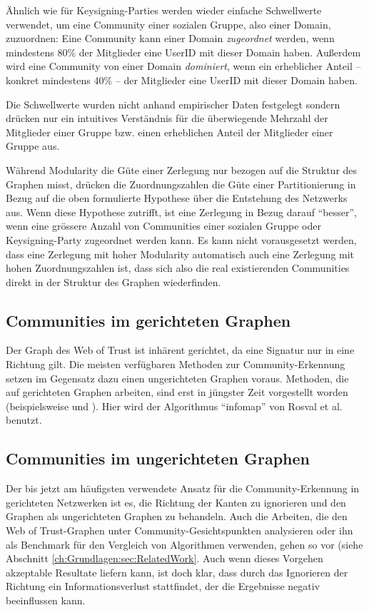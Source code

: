 Ähnlich wie für Keysigning-Parties werden wieder einfache
Schwellwerte verwendet, um eine Community einer sozialen Gruppe, also
einer Domain, zuzuordnen: Eine Community kann einer Domain
\emph{zugeordnet} werden, wenn mindestens 80\% der Mitglieder
eine UserID mit dieser Domain haben. Außerdem wird eine Community von
einer Domain \emph{dominiert}, wenn ein erheblicher Anteil -- konkret
mindestens 40\% -- der Mitglieder eine UserID mit dieser Domain haben.

Die Schwellwerte wurden nicht anhand empirischer Daten festgelegt
sondern drücken nur ein intuitives Verständnis für die
überwiegende Mehrzahl der Mitglieder einer Gruppe bzw. einen
erheblichen Anteil der Mitglieder einer Gruppe aus.

Während Modularity die Güte einer Zerlegung nur bezogen auf die
Struktur des Graphen misst, drücken die Zuordnungszahlen die Güte
einer Partitionierung in Bezug auf die oben formulierte Hypothese
über die Entstehung des Netzwerks aus. Wenn diese Hypothese
zutrifft, ist eine Zerlegung in Bezug darauf ``besser'', wenn eine
grössere Anzahl von Communities einer sozialen Gruppe oder
Keysigning-Party zugeordnet werden kann. Es kann nicht vorausgesetzt
werden, dass eine Zerlegung mit hoher Modularity automatisch auch eine
Zerlegung mit hohen Zuordnungszahlen ist, dass sich also die real
existierenden Communities direkt in der Struktur des Graphen
wiederfinden.

\subsection{Communities im gerichteten Graphen}
\label{sec:comm-gericht-graph}
Der Graph des Web of Trust ist inhärent gerichtet, da eine Signatur
nur in eine Richtung gilt. Die meisten verfügbaren Methoden zur
Community-Erkennung setzen im Gegensatz dazu einen ungerichteten
Graphen voraus. Methoden, die auf gerichteten Graphen arbeiten, sind
erst in jüngster Zeit vorgestellt worden (beispielsweise
\cite{Leicht2008} und \cite{Rosvall2008}). Hier wird der Algorithmus
``infomap'' von Rosval et al.\cite{Rosvall2008} benutzt. 

\subsection{Communities im ungerichteten Graphen}
\label{sec:comm-unger-graph}


Der bis jetzt am häufigsten verwendete Ansatz für die
Community-Erkennung in gerichteten Netzwerken ist es, die Richtung der
Kanten zu ignorieren und den Graphen als ungerichteten Graphen zu
behandeln. Auch die Arbeiten, die den Web of Trust-Graphen unter
Community-Gesichtspunkten analysieren oder ihn als Benchmark für den
Vergleich von Algorithmen verwenden, gehen so vor (siehe Abschnitt
\ref{ch:Grundlagen:sec:RelatedWork}. Auch wenn dieses Vorgehen akzeptable Resultate
liefern kann, ist doch klar, dass durch das Ignorieren der Richtung
ein Informationsverlust stattfindet, der die Ergebnisse negativ
beeinflussen kann.

